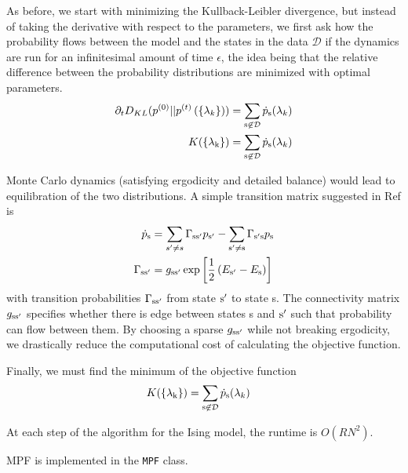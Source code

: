\documentclass[aps,prl,twocolumn,nofootinbib]{revtex4-1}
\begin{document}
As before, we start with minimizing the Kullback-Leibler divergence, but instead of taking the derivative with respect to the parameters, we first ask how the probability flows between the model and the states in the data $\mathcal{D}$ if the dynamics are run for an infinitesimal amount of time $\epsilon$, the idea being that the relative difference between the probability distributions are minimized with optimal parameters.
\begin{align}
	\partial_t D_{KL}(p^{(0)}||p^{(t)}\left(\{\lambda_k\}\right)) &= \sum_{\rm s \not\in \mathcal{D}} \dot{p}_{\rm s}(\lambda_k)\\
	K(\{\lambda_{\rm k}\}) &= \sum_{\rm s \not\in \mathcal{D}} \dot{p}_{\rm s}(\lambda_k)
\end{align}

Monte Carlo dynamics (satisfying ergodicity and detailed balance) would lead to equilibration of the two distributions. A simple transition matrix suggested in Ref \cite{SohlDickstein:2011im} is
\begin{align}
	\dot{p}_{\rm s} &= \sum_{s'\neq s} \Gamma_{\rm ss'} p_{\rm s'} -\sum_{\rm s'\neq s} \Gamma_{\rm s's} p_{\rm s}\\
	\Gamma_{\rm ss'} &= g_{\rm ss'}\exp\left[ \frac{1}{2}\left( E_{\rm s'}-E_{\rm s} \right) \right]
\end{align}
with transition probabilities $\Gamma_{\rm ss'}$ from state ${\rm s'}$ to state s. The connectivity matrix $g_{\rm ss'}$ specifies whether there is edge between states s and ${\rm s'}$ such that probability can flow between them. By choosing a sparse $g_{\rm ss'}$ while not breaking ergodicity, we drastically reduce the computational cost of calculating the objective function.

Finally, we must find the minimum of the objective function
\begin{align}
	K(\{\lambda_{\rm k}\}) &= \sum_{\rm s \not\in \mathcal{D}} \dot{p}_{\rm s}(\lambda_k)
\end{align}


At each step of the algorithm for the Ising model, the runtime is $O(RN^2)$.

MPF is implemented in the {\tt MPF} class.
\end{document}
